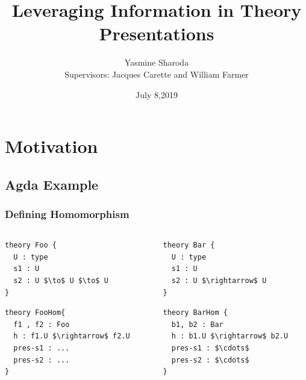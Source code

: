 \documentclass[t,12pt,numbers,fleqn,usenames,xcolor=dvipsnames]{beamer}
\title{Leveraging Information in Theory Presentations}
\author{Yasmine Sharoda\\ \vspace{0.5cm} Supervisors: Jacques Carette and William Farmer}
\institute[]{Department of Computing and Software, McMaster University}
\date{July 8,2019}
\begin{document}
\begin{frame}
\titlepage
\end{frame}

\section{Motivation}

\subsection{Agda Example}
\begin{frame}[fragile]
\frametitle{Defining Homomorphism}
\begin{columns}
	\begin{column}{0.45\textwidth}
		\begin{lstlisting}[mathescape]
theory Foo { 
  U : type 
  s1 : U 
  s2 : U $\to$ U $\to$ U
}
		\end{lstlisting}
\pause		
		\begin{lstlisting}
theory FooHom{
  f1 , f2 : Foo 
  h : f1.U $\rightarrow$ f2.U 
  pres-s1 : ... 
  pres-s2 : ... 
}
		\end{lstlisting}
	\end{column}
	\begin{column}{0.45\textwidth}
\pause		
	 	\begin{lstlisting}
theory Bar {
  U : type 
  s1 : U 
  s2 : U $\rightarrow$ U 
}
	 	\end{lstlisting}
\pause
		\begin{lstlisting}
theory BarHom { 
  b1, b2 : Bar 
  h : b1.U $\rightarrow$ b2.U 
  pres-s1 : $\cdots$
  pres-s2 : $\cdots$
}
		\end{lstlisting}
	\end{column}
\end{columns}
\end{frame}
\end{document}
